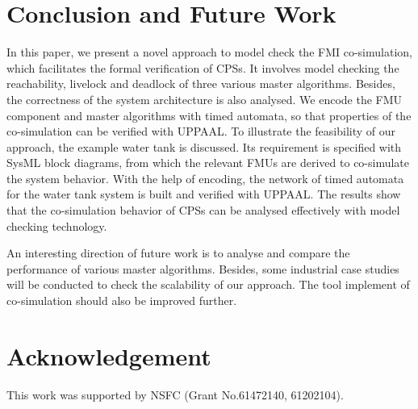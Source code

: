 \section{Conclusion and Future Work}
\label{sec:conclusion&ack}
In this paper, we present a novel approach to model check the FMI co-simulation, which facilitates the formal verification of CPSs. It involves model checking the reachability, livelock and deadlock of three various master algorithms. Besides, the correctness of the system architecture is also analysed. We encode the FMU component and master algorithms with timed automata, so that properties of the co-simulation can be verified with UPPAAL. To illustrate the feasibility of our approach, the example water tank is discussed. Its requirement is specified with SysML block diagrams, from which the relevant FMUs are derived to co-simulate the system behavior. With the help of encoding, the network of timed automata for the water tank system is built and verified with UPPAAL. The results show that the co-simulation behavior of CPSs can be analysed effectively with model checking technology.

An interesting direction of future work is to analyse and compare the performance of various master algorithms. Besides, some industrial case studies will be conducted to check the scalability of our approach. The tool implement of co-simulation should also be improved further.
\section*{Acknowledgement}
This work was supported by NSFC (Grant No.61472140, 61202104). 



